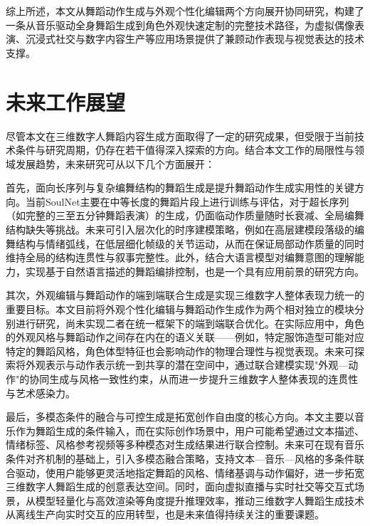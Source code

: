 综上所述，本文从舞蹈动作生成与外观个性化编辑两个方向展开协同研究，构建了一条从音乐驱动全身舞蹈生成到角色外观快速定制的完整技术路径，为虚拟偶像表演、沉浸式社交与数字内容生产等应用场景提供了兼顾动作表现与视觉表达的技术支撑。

\section{未来工作展望}

尽管本文在三维数字人舞蹈内容生成方面取得了一定的研究成果，但受限于当前技术条件与研究周期，仍存在若干值得深入探索的方向。结合本文工作的局限性与领域发展趋势，未来研究可从以下几个方面展开：

首先，面向长序列与复杂编舞结构的舞蹈生成是提升舞蹈动作生成实用性的关键方向。当前SoulNet主要在中等长度的舞蹈片段上进行训练与评估，对于超长序列（如完整的三至五分钟舞蹈表演）的生成，仍面临动作质量随时长衰减、全局编舞结构缺失等挑战。未来可引入层次化的时序建模策略，例如在高层建模段落级的编舞结构与情绪弧线，在低层细化帧级的关节运动，从而在保证局部动作质量的同时维持全局的结构连贯性与叙事完整性。此外，结合大语言模型对编舞意图的理解能力，实现基于自然语言描述的舞蹈编排控制，也是一个具有应用前景的研究方向。

其次，外观编辑与舞蹈动作的端到端联合生成是实现三维数字人整体表现力统一的重要目标。本文目前将外观个性化编辑与舞蹈动作生成作为两个相对独立的模块分别进行研究，尚未实现二者在统一框架下的端到端联合优化。在实际应用中，角色的外观风格与舞蹈动作之间存在内在的语义关联——例如，特定服饰造型可能对应特定的舞蹈风格，角色体型特征也会影响动作的物理合理性与视觉表现。未来可探索将外观表示与动作表示统一到共享的潜在空间中，通过联合建模实现"外观—动作"的协同生成与风格一致性约束，从而进一步提升三维数字人整体表现的连贯性与艺术感染力。

最后，多模态条件的融合与可控生成是拓宽创作自由度的核心方向。本文主要以音乐作为舞蹈生成的条件输入，而在实际创作场景中，用户可能希望通过文本描述、情绪标签、风格参考视频等多种模态对生成结果进行联合控制。未来可在现有音乐条件对齐机制的基础上，引入多模态融合策略，支持文本—音乐—风格的多条件联合驱动，使用户能够更灵活地指定舞蹈的风格、情绪基调与动作偏好，进一步拓宽三维数字人舞蹈生成的创意表达空间。同时，面向虚拟直播与实时社交等交互式场景，从模型轻量化与高效渲染等角度提升推理效率，推动三维数字人舞蹈生成技术从离线生产向实时交互的应用转型，也是未来值得持续关注的重要课题。